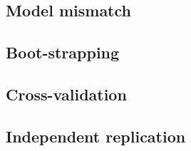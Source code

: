 \subsection{Model mismatch}

\subsection{Boot-strapping}

\subsection{Cross-validation}

\subsection{Independent replication}




